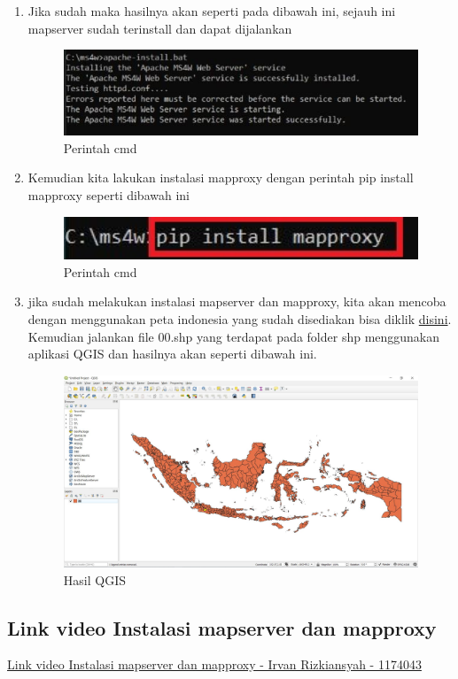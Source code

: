 \begin{enumerate}
			\item Jika sudah maka hasilnya akan seperti pada dibawah ini, sejauh ini mapserver sudah terinstall dan dapat dijalankan
				\begin{figure}[H]
					\includegraphics[width=12cm]{figures/1174043/TUGAS4/4.JPG}
					\centering
					\caption{Perintah cmd}
				\end{figure}
				
			\item Kemudian kita lakukan instalasi mapproxy dengan perintah pip install mapproxy seperti dibawah ini
				\begin{figure}[H]
					\includegraphics[width=12cm]{figures/1174043/TUGAS4/5.JPG}
					\centering
					\caption{Perintah cmd}
				\end{figure}
				
			\item jika sudah melakukan instalasi mapserver dan mapproxy, kita akan mencoba dengan menggunakan peta indonesia yang sudah disediakan bisa diklik \href{https://github.com/awangga/gede} {disini}. Kemudian jalankan file 00.shp yang terdapat pada folder shp menggunakan aplikasi QGIS dan hasilnya akan seperti dibawah ini.
				\begin{figure}[H]
					\includegraphics[width=12cm]{figures/1174043/TUGAS4/6.JPG}
					\centering
					\caption{Hasil QGIS}
				\end{figure}
				
		\end{enumerate}
			
	\subsection{Link video Instalasi mapserver dan mapproxy}
		\href{https://youtu.be/i0Igx8knqpQ} {Link video Instalasi mapserver dan mapproxy - Irvan Rizkiansyah - 1174043}